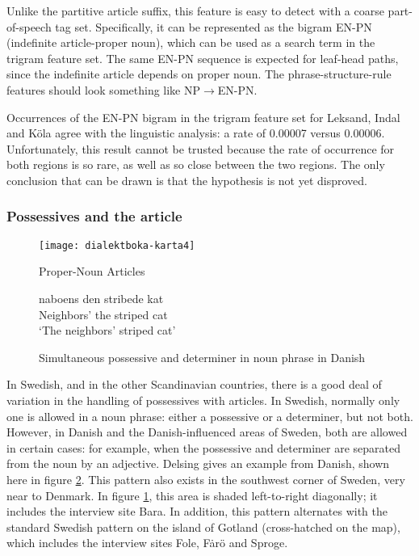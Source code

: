 Unlike the partitive article suffix, this feature is easy to detect
with a coarse part-of-speech tag set. Specifically, it can be represented as the
bigram EN-PN (indefinite article-proper noun), which can be used as a
search term in the trigram feature set. The same EN-PN sequence is
expected for leaf-head paths, since the indefinite article depends on
proper noun. The phrase-structure-rule features should
look something like NP$\to$EN-PN.

Occurrences of the EN-PN bigram in the trigram feature set for
Leksand, Indal and K\"ola agree with the linguistic analysis: a rate
of 0.00007 versus 0.00006. Unfortunately, this result cannot be
trusted because the rate of occurrence for both regions is so rare, as
well as so close between the two regions. The only conclusion that can
be drawn is that the hypothesis is not yet disproved.

\subsubsection{Possessives and the article}

\begin{figure}
  \texttt{[image: dialektboka-karta4]}
  \caption{Proper-Noun Articles}
  \label{possessive-plus-article-map}
\end{figure}

\begin{figure}
 \gll naboens den stribede kat \\
  Neighbors' the striped cat \\
  \trans `The neighbors' striped cat'
  \caption{Simultaneous possessive and determiner in noun phrase in
    Danish}
  \label{possessive-plus-article-example}
\end{figure}

In Swedish, and in the other Scandinavian countries, there is a good
deal of variation in the handling of possessives with articles. In
Swedish, normally only one is allowed in a noun phrase: either a
possessive or a determiner, but not both. However, in Danish and the
Danish-influenced areas of Sweden, both are allowed in certain cases:
for example, when the possessive and determiner are separated from the
noun by an adjective. Delsing gives an example from Danish, shown here
in figure \ref{possessive-plus-article-example}.  This pattern also
exists in the southwest corner of Sweden, very near to Denmark. In
figure \ref{possessive-plus-article-map}, this area is shaded
left-to-right diagonally; it includes the interview site Bara. In
addition, this pattern alternates with the standard Swedish pattern on
the island of Gotland (cross-hatched on the map), which includes the
interview sites Fole, F\.ar\"o and Sproge.

